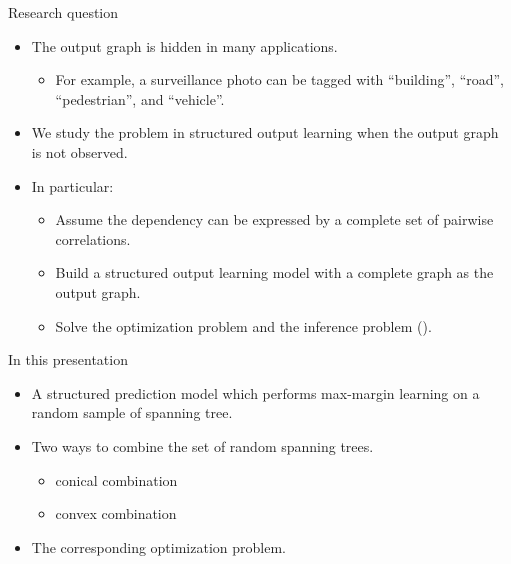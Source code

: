 \documentclass[first=dgreen,second=purple,logo=yellowexc]{aaltoslides}
\begin{document}
%
\begin{frame}{Research question}
	\begin{itemize}
		\item The output graph is hidden in many applications.
		\begin{itemize}
			\item For example, a surveillance photo can be tagged with ``building'', ``road'', ``pedestrian'', and ``vehicle''.
		\end{itemize}
		\item We study the problem in structured output learning when the output graph is not observed.
		\item In particular:
		\begin{itemize}
			\item Assume the dependency can be expressed by a complete set of pairwise correlations.
			\item Build a structured output learning model with a complete graph as the output graph.
			\item Solve the optimization problem and the inference problem (\nphard).
		\end{itemize}
	\end{itemize}
\end{frame}



%
\begin{frame}{In this presentation}
	\begin{itemize}
		\item A structured prediction model which performs max-margin learning on a random sample of spanning tree.
		\item Two ways to combine the set of random spanning trees.
		\begin{itemize}
			\item conical combination
			\item convex combination
		\end{itemize}
		\item The corresponding optimization problem.
	\end{itemize}
\end{frame}
\end{document}
